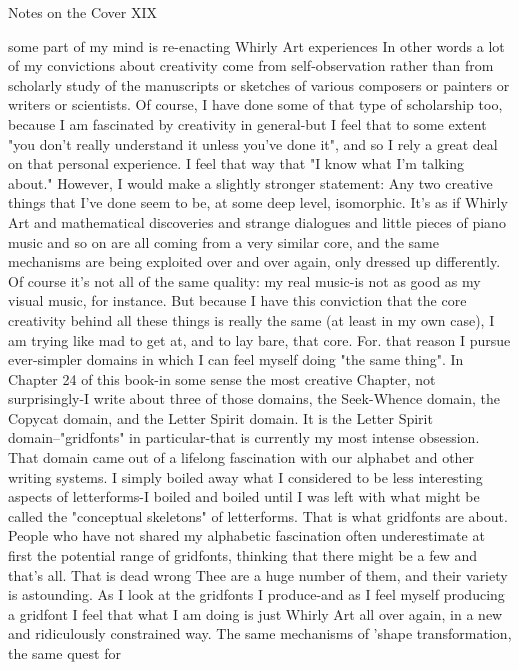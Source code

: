 Notes on the Cover                                                                   XIX

some part of my mind is re-enacting Whirly Art experiences In other words a lot of
my convictions about creativity come from self-observation rather than from scholarly
study of the manuscripts or sketches of various composers or painters or writers or
scientists. Of course, I have done some of that type of scholarship too, because I am
fascinated by creativity in general-but I feel that to some extent "you don't really
understand it unless you've done it", and so I rely a great deal on that personal
experience. I feel that way that "I know what I'm talking about."
        However, I would make a slightly stronger statement: Any two creative things
that I've done seem to be, at some deep level, isomorphic. It's as if Whirly Art and
mathematical discoveries and strange dialogues and little pieces of piano music and so
on are all coming from a very similar core, and the same mechanisms are being
exploited over and over again, only dressed up differently. Of course it's not all of the
same quality: my real music-is not as good as my visual music, for instance. But
because I have this conviction that the core creativity behind all these things is really
the same (at least in my own case), I am trying like mad to get at, and to lay bare, that
core. For. that reason I pursue ever-simpler domains in which I can feel myself doing
"the same thing". In Chapter 24 of this book-in some sense the most creative Chapter,
not surprisingly-I write about three of those domains, the Seek-Whence domain, the
Copycat domain, and the Letter Spirit domain.
        It is the Letter Spirit domain--"gridfonts" in particular-that is currently my
most intense obsession. That domain came out of a lifelong fascination with our
alphabet and other writing systems. I simply boiled away what I considered to be less
interesting aspects of letterforms-I boiled and boiled until I was left with what might
be called the "conceptual skeletons" of letterforms. That is what gridfonts are about.
People who have not shared my alphabetic fascination often underestimate at first the
potential range of gridfonts, thinking that there might be a few and that's all. That is
dead wrong Thee are a huge number of them, and their variety is astounding.
        As I look at the gridfonts I produce-and as I feel myself producing a gridfont I
feel that what I am doing is just Whirly Art all over again, in a new and ridiculously
constrained way. The same mechanisms of 'shape transformation, the same quest for
